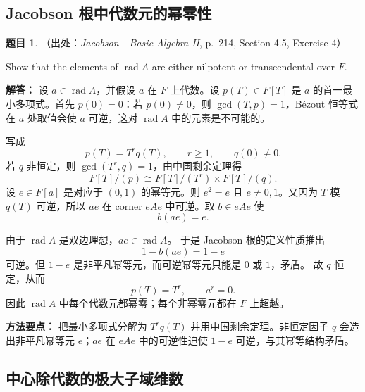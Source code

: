 \documentclass[a4paper]{ctexart}
\theoremstyle{definition}
\newtheorem{example}{题目}[section]
\theoremstyle{analysis}
\theoremstyle{plain}
\begin{document}
\subsection{Jacobson 根中代数元的幂零性}\label{subsec:problem-radical-algebraic-nilpotent}

\begin{example}
（出处：\textit{Jacobson - Basic Algebra II}, p.~214, Section 4.5, Exercise 4）

Show that the elements of \(\operatorname{rad} A\) are either nilpotent or
transcendental over \(F\).

\textbf{解答：}
设 \(a\in\operatorname{rad} A\)，并假设 \(a\) 在 \(F\) 上代数。设
\(p(T)\in F[T]\) 是 \(a\) 的首一最小多项式。首先 \(p(0)=0\)：若
\(p(0)\neq 0\)，则 \(\gcd(T,p)=1\)，Bézout 恒等式在 \(a\) 处取值会使
\(a\) 可逆，这对 \(\operatorname{rad} A\) 中的元素是不可能的。

写成
\[
  p(T)=T^r q(T),\qquad r\geq 1,\qquad q(0)\neq 0.
\]
若 \(q\) 非恒定，则 \(\gcd(T^r,q)=1\)，由中国剩余定理得
\[
  F[T]/(p)\cong F[T]/(T^r)\times F[T]/(q).
\]
设 \(e\in F[a]\) 是对应于 \((0,1)\) 的幂等元。则 \(e^2=e\) 且
\(e\neq 0,1\)。又因为 \(T\) 模 \(q(T)\) 可逆，所以 \(ae\) 在 corner
\(eAe\) 中可逆。取 \(b\in eAe\) 使
\[
  b(ae)=e.
\]

由于 \(\operatorname{rad} A\) 是双边理想，\(ae\in\operatorname{rad} A\)。
于是 Jacobson 根的定义性质推出
\[
  1-b(ae)=1-e
\]
可逆。但 \(1-e\) 是非平凡幂等元，而可逆幂等元只能是 \(0\) 或 \(1\)，矛盾。
故 \(q\) 恒定，从而
\[
  p(T)=T^r,\qquad a^r=0.
\]
因此 \(\operatorname{rad} A\) 中每个代数元都幂零；每个非幂零元都在 \(F\) 上超越。

\textbf{方法要点：}
把最小多项式分解为 \(T^r q(T)\) 并用中国剩余定理。非恒定因子 \(q\) 会造出非平凡幂等元 \(e\)；\(ae\) 在 \(eAe\) 中的可逆性迫使 \(1-e\) 可逆，与其幂等结构矛盾。
\end{example}

\subsection{中心除代数的极大子域维数}\label{subsec:problem-maximal-subfield-degree}
\end{document}
